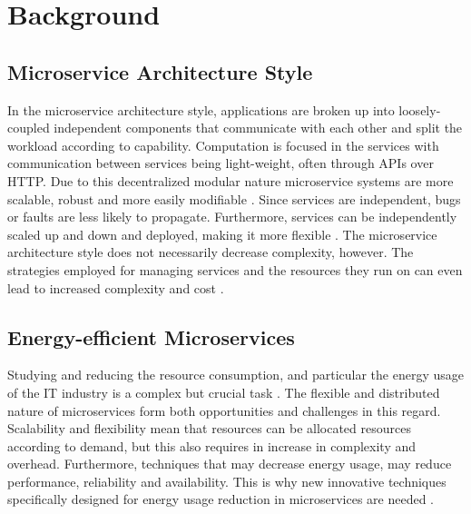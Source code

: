 \section{Background}\label{s:background}

\subsection{Microservice Architecture Style}
In the microservice architecture style, applications are broken up into loosely-coupled independent components that communicate with each other and split the workload according to capability. Computation is focused in the services with communication between services being light-weight, often through APIs over HTTP. Due to this decentralized modular nature microservice systems are more scalable, robust and more easily modifiable \cite{mazzara_microservices_2018}. Since services are independent, bugs or faults are less likely to propagate. Furthermore, services can be independently scaled up and down and deployed, making it more flexible \cite{dragoni_microservices_2017}. The microservice architecture style does not necessarily decrease complexity, however. The strategies employed for managing services and the resources they run on can even lead to increased complexity and cost \cite{pirhonen_pains_2025}.

\subsection{Energy-efficient Microservices}
Studying and reducing the resource consumption, and particular the energy usage of the IT industry is a complex but crucial task \cite{verdecchia_green_2021}. The flexible and distributed nature of microservices form both opportunities and challenges in this regard. Scalability and flexibility mean that resources can be allocated resources according to demand, but this also requires in increase in complexity and overhead. Furthermore, techniques that may decrease energy usage, may reduce performance, reliability and availability. This is why new innovative techniques specifically designed for energy usage reduction in microservices are needed \cite{araujo_energy_2024, xiao_architectural_2024}.

